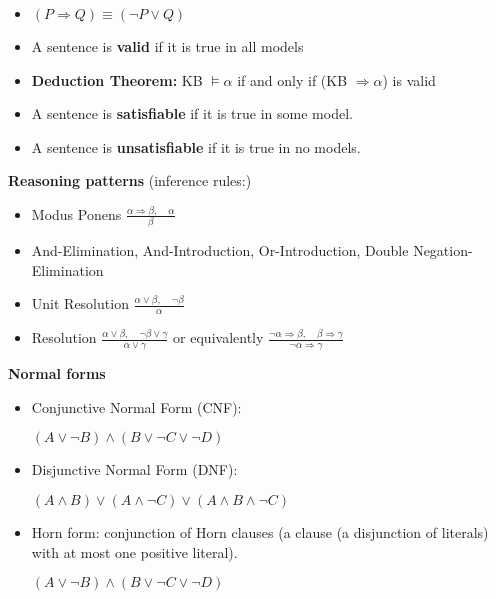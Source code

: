 \documentclass{../cheat}
\begin{document}
\begin{multicols}{3}
 		\begin{itemize}
 			\item $(P \Rightarrow Q) \equiv (\neg P \vee Q)$
 			\item A sentence is \textbf{valid} if it is true in all models
 			\item \textbf{Deduction Theorem:} KB $\models \alpha$ if and only if (KB $\Rightarrow \alpha$) is valid
 			\item A sentence is \textbf{satisfiable} if it is true in some model.
 			\item A sentence is \textbf{unsatisfiable} if it is true in no models.

 		\end{itemize}
 		
 		\textbf{Reasoning patterns} (inference rules:)
 		\begin{itemize}
 			\item Modus Ponens
 				$\frac{ \alpha \Rightarrow \beta, \quad \alpha}{ \beta }$
 			\item And-Elimination, And-Introduction, Or-Introduction, Double Negation-Elimination
 			\item Unit Resolution
		 		$\frac{ \alpha \vee \beta, \quad \neg \beta}{\alpha}$
 			\item Resolution
		 		$\frac{\alpha \vee \beta, \quad \neg \beta \vee \gamma }{\alpha \vee \gamma}$ or equivalently
		 		$\frac{\neg \alpha \Rightarrow \beta, \quad \beta \Rightarrow \gamma }{\neg \alpha \Rightarrow \gamma}$
 		\end{itemize}
  		
  		\textbf{Normal forms}
  		\begin{itemize}
  			\item Conjunctive Normal Form (CNF):\\
  				\centerline{$(A \vee \neg B) \wedge (B \vee \neg C \vee \neg D)$}
  			\item Disjunctive Normal Form (DNF):\\
  				\centerline{$(A \wedge B) \vee (A \wedge \neg C) \vee (A \wedge B \wedge \neg C)$}
  			\item Horn form: conjunction of Horn clauses (a clause (a disjunction of literals) with at most one positive literal).\\
  				\centerline{$(A \vee \neg B) \wedge (B \vee \neg C \vee \neg D)$}
  		\end{itemize}
 		

\end{multicols}
\end{document}
